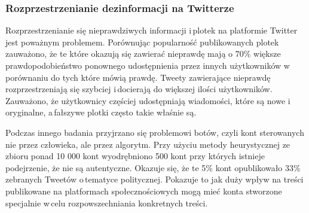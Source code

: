 \subsubsection{Rozprzestrzenianie dezinformacji na Twitterze}
Rozprzestrzenianie się nieprawdziwych informacji i\,plotek na platformie Twitter jest poważnym problemem. Porównując popularność publikowanych plotek zauważono, że te które okazują się zawierać nieprawdę mają o 70\% większe prawdopodobieństwo ponownego udostępnienia przez innych użytkowników w\,porównaniu do tych które mówią prawdę\cite{vosoughi2018spread}. Tweety zawierające nieprawdę rozprzestrzeniają się szybciej i\,docierają do większej ilości użytkowników. Zauważono, że użytkownicy częściej udostępniają wiadomości, które są nowe i\,oryginalne, a\,fałszywe plotki często takie właśnie są. 
\par
Podczas innego badania przyjrzano się problemowi botów, czyli kont sterowanych nie przez człowieka, ale przez algorytm\cite{gorwa2017computational}. Przy użyciu metody heurystycznej ze zbioru ponad 10 000 kont wyodrębniono 500 kont przy których istnieje podejrzenie, że nie są autentyczne. Okazuje się, że te 5\% kont opublikowało 33\% zebranych Tweetów o\,tematyce politycznej. Pokazuje to jak duży wpływ na treści publikowane na platformach społecznościowych mogą mieć konta stworzone specjalnie w\,celu rozpowszechniania konkretnych treści. 
